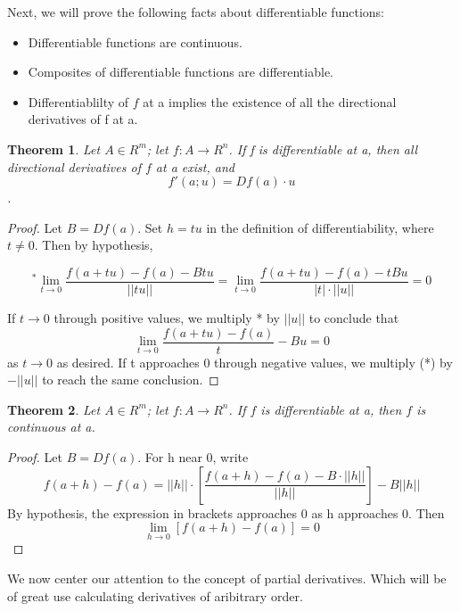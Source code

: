 \documentclass[12pt, letterpaper]{article}
\newtheorem{theorem}{Theorem}[section]
\begin{document}
		Next, we will prove the following facts about differentiable functions:
		\begin{itemize}
			\item Differentiable functions are continuous.
			\item Composites of differentiable functions are differentiable.
			\item Differentiablilty of $f$ at a implies the existence of all the directional derivatives of f at a.\newline
		\end{itemize}
		
		
		\begin{theorem}
			Let $A \in R^m$; let $f: A \to R^n$. If f is differentiable at a, then all directional derivatives of $f$ at a exist, and
				\[f'(a;u) = Df(a) \cdot u\].
		\end{theorem}
		\begin{proof}
			Let $B = Df(a)$. Set $h = tu$ in the definition of differentiability, where $t \ne 0$. Then by hypothesis,
			
				
				\[^* \lim_{t \to 0} \frac{f(a+tu) - f(a) - Btu}{||tu||} = \lim_{t \to 0} \frac{f(a+tu) - f(a)  - tBu}{|t|\cdot||u||} = 0\]
				
			If $t \to 0$ through positive values, we multiply * by $||u||$ to conclude that
				\[ \lim_{t \to 0} \frac{f(a+tu) - f(a)}{t} - Bu = 0\]
			as $t \to 0$ as desired.
			If t approaches 0 through negative values, we multiply (*) by $-||u||$ to reach the same conclusion.\newline
		\end{proof}		
		
		
		\begin{theorem}
			Let $A \in R^m$; let $f:A \to R^n$. If $f$ is differentiable at a, then $f$ is continuous at a.
		\end{theorem}
		\begin{proof}
			Let $B = Df(a)$. For h near 0, write\newline 
				\[ f(a+h) - f(a) = ||h||\cdot\left[ \frac{f(a+h) - f(a) - B\cdot||h||}{||h||}\right] - B||h||\]
			By hypothesis, the expression in brackets approaches 0 as h approaches 0.
			Then 
				\[\lim_{h\to0}\left[f(a+h) - f(a)\right] = 0\]\newline
		\end{proof}
		
		
		
		We now center our attention to the concept of partial derivatives. Which will be of great use calculating derivatives of aribitrary order.\newline
		
\end{document}
